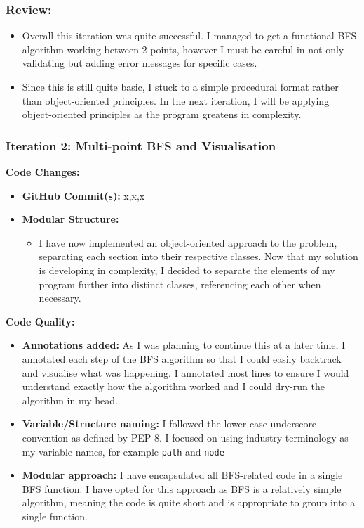 \subsubsection{Review:}
\begin{itemize}
    \item Overall this iteration was quite successful. I managed to get a functional BFS algorithm working between 2 points, however I must be careful in not only validating but adding error messages for specific cases.
    \item Since this is still quite basic, I stuck to a simple procedural format rather than object-oriented principles. In the next iteration, I will be applying object-oriented principles as the program greatens in complexity.
\end{itemize}



\newpage

\subsubsection{Iteration 2: Multi-point BFS and Visualisation}

\textbf{Code Changes:}
\begin{itemize}
    \item \textbf{GitHub Commit(s):} x,x,x
    \item \textbf{Modular Structure:}
    \begin{itemize}
        \item I have now implemented an object-oriented approach to the problem, separating each section into their respective classes. Now that my solution is developing in complexity, I decided to separate the elements of my program further into distinct classes, referencing each other when necessary.
    \end{itemize}
\end{itemize}

\textbf{Code Quality:}
\begin{itemize}
    \item \textbf{Annotations added:} As I was planning to continue this at a later time, I annotated each step of the BFS algorithm so that I could easily backtrack and visualise what was happening. I annotated most lines to ensure I would understand exactly how the algorithm worked and I could dry-run the algorithm in my head.
    \item \textbf{Variable/Structure naming:} I followed the lower-case underscore convention as defined by PEP 8. I focused on using industry terminology as my variable names, for example \verb|path| and \verb|node| 
    \item \textbf{Modular approach:} I have encapsulated all BFS-related code in a single BFS function. I have opted for this approach as BFS is a relatively simple algorithm, meaning the code is quite short and is appropriate to group into a single function.
\end{itemize}

